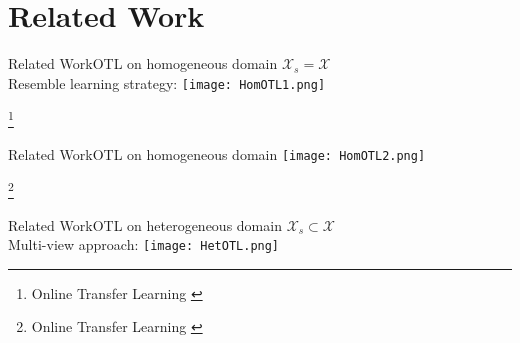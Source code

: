 \documentclass{beamer}
\begin{document}
\section{Related Work}
\begin{frame}{Related Work}{OTL on homogeneous domain}
$ \mathcal{X}_s = \mathcal{X} $
\\
Resemble learning strategy: 
\texttt{[image: HomOTL1.png]}
\begin{footnotesize}
\footnote{Online Transfer Learning \cite{zhao2014online}}
\end{footnotesize}
\end{frame}


\begin{frame}{Related Work}{OTL on homogeneous domain}
\texttt{[image: HomOTL2.png]}
\begin{footnotesize}
\footnote{Online Transfer Learning \cite{zhao2014online}}
\end{footnotesize}
\end{frame}

\begin{frame}{Related Work}{OTL on heterogeneous domain}
$ \mathcal{X}_s \subset \mathcal{X} $
\\
Multi-view approach:
\texttt{[image: HetOTL.png]}
\end{frame}

%
\end{document}

